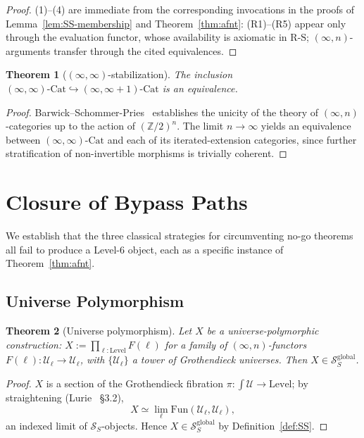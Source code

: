 \documentclass[11pt]{article}
\theoremstyle{plain}
\newtheorem{theorem}{Theorem}[section]
\theoremstyle{definition}
\newcommand{\RS}{\mathrm{R\text{-}S}}
\newcommand{\cS}{\mathcal{S}}
\newcommand{\cU}{\mathcal{U}}
\newcommand{\Fun}{\mathrm{Fun}}
\newcommand{\Cat}{\mathrm{Cat}}
\begin{document}
\begin{proof}
(1)--(4) are immediate from the corresponding invocations in the proofs of Lemma~\ref{lem:SS-membership} and Theorem~\ref{thm:afnt}: (R1)--(R5) appear only through the evaluation functor, whose availability is axiomatic in $\RS$; $(\infty, n)$-arguments transfer through the cited equivalences.
\end{proof}

\begin{theorem}[$(\infty, \infty)$-stabilization]\label{thm:stab}
The inclusion $(\infty, \infty)\text{-}\Cat \hookrightarrow (\infty, \infty + 1)\text{-}\Cat$ is an equivalence.
\end{theorem}

\begin{proof}
Barwick--Schommer-Pries~\cite{BarwickSchommerPries2021} establishes the unicity of the theory of $(\infty, n)$-categories up to the action of $(\mathbb{Z}/2)^n$. The limit $n \to \infty$ yields an equivalence between $(\infty, \infty)$-$\Cat$ and each of its iterated-extension categories, since further stratification of non-invertible morphisms is trivially coherent.
\end{proof}

\section{Closure of Bypass Paths}\label{sec:bypass}

We establish that the three classical strategies for circumventing no-go theorems all fail to produce a Level-6 object, each as a specific instance of Theorem~\ref{thm:afnt}.

\subsection{Universe Polymorphism}

\begin{theorem}[Universe polymorphism]\label{thm:universe}
Let $X$ be a universe-polymorphic construction: $X := \prod_{\ell : \mathrm{Level}} F(\ell)$ for a family of $(\infty, n)$-functors $F(\ell) : \cU_\ell \to \cU_\ell$, with $\{\cU_\ell\}$ a tower of Grothendieck universes. Then $X \in \cS_S^{\mathrm{global}}$.
\end{theorem}

\begin{proof}
$X$ is a section of the Grothendieck fibration $\pi : \int \cU \to \mathrm{Level}$; by straightening (Lurie~\cite{LurieHTT} \S 3.2),
\[ X \simeq \lim_\ell \Fun(\cU_\ell, \cU_\ell), \]
an indexed limit of $\cS_S$-objects. Hence $X \in \cS_S^{\mathrm{global}}$ by Definition~\ref{def:SS}.
\end{proof}
\end{document}
